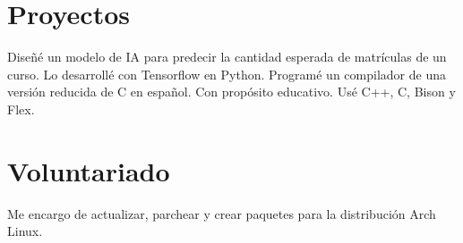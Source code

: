 \documentclass[10pt, a4paper]{moderncv}
\begin{document}
\section{Proyectos}
{
	Diseñé un modelo de IA para predecir la cantidad esperada de matrículas de un curso.
	Lo desarrollé con Tensorflow en Python.
}
{
	Programé un compilador de una versión reducida de C en español.
	Con propósito educativo.
	Usé C++, C, Bison y Flex.
}

\section{Voluntariado}
{
	Me encargo de actualizar, parchear y crear paquetes para la distribución
	Arch Linux.
}

\end{document}
